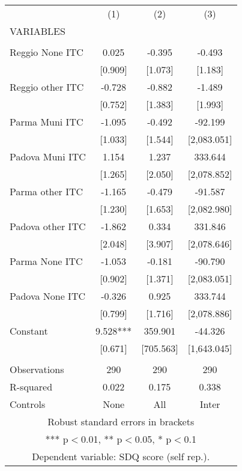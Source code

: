 \begin{tabular}{lccc} \hline
 & (1) & (2) & (3) \\
VARIABLES &  &  &  \\ \hline
 &  &  &  \\
Reggio None ITC & 0.025 & -0.395 & -0.493 \\
 & [0.909] & [1.073] & [1.183] \\
Reggio other ITC & -0.728 & -0.882 & -1.489 \\
 & [0.752] & [1.383] & [1.993] \\
Parma Muni ITC & -1.095 & -0.492 & -92.199 \\
 & [1.033] & [1.544] & [2,083.051] \\
Padova Muni ITC & 1.154 & 1.237 & 333.644 \\
 & [1.265] & [2.050] & [2,078.852] \\
Parma other ITC & -1.165 & -0.479 & -91.587 \\
 & [1.230] & [1.653] & [2,082.980] \\
Padova other ITC & -1.862 & 0.334 & 331.846 \\
 & [2.048] & [3.907] & [2,078.646] \\
Parma None ITC & -1.053 & -0.181 & -90.790 \\
 & [0.902] & [1.371] & [2,083.051] \\
Padova None ITC & -0.326 & 0.925 & 333.744 \\
 & [0.799] & [1.716] & [2,078.886] \\
Constant & 9.528*** & 359.901 & -44.326 \\
 & [0.671] & [705.563] & [1,643.045] \\
 &  &  &  \\
Observations & 290 & 290 & 290 \\
R-squared & 0.022 & 0.175 & 0.338 \\
 Controls & None & All & Inter \\ \hline
\multicolumn{4}{c}{ Robust standard errors in brackets} \\
\multicolumn{4}{c}{ *** p$<$0.01, ** p$<$0.05, * p$<$0.1} \\
\multicolumn{4}{c}{ Dependent variable: SDQ score (self rep.).} \\
\end{tabular}
